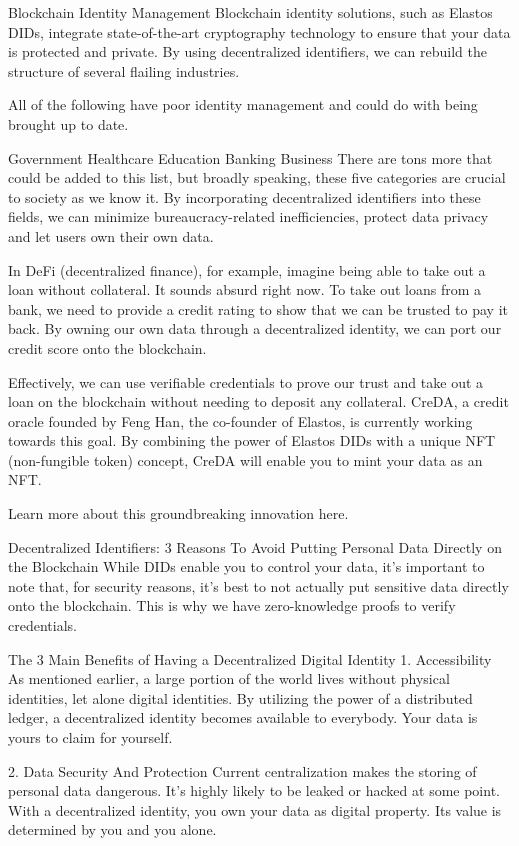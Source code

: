 Blockchain Identity Management
Blockchain identity solutions, such as Elastos DIDs, integrate state-of-the-art cryptography technology to ensure that your data is protected and private. By using decentralized identifiers, we can rebuild the structure of several flailing industries. 

All of the following have poor identity management and could do with being brought up to date.

Government
Healthcare
Education
Banking
Business
There are tons more that could be added to this list, but broadly speaking, these five categories are crucial to society as we know it. By incorporating decentralized identifiers into these fields, we can minimize bureaucracy-related inefficiencies, protect data privacy and let users own their own data.

In DeFi (decentralized finance), for example, imagine being able to take out a loan without collateral. It sounds absurd right now. To take out loans from a bank, we need to provide a credit rating to show that we can be trusted to pay it back. By owning our own data through a decentralized identity, we can port our credit score onto the blockchain.

Effectively, we can use verifiable credentials to prove our trust and take out a loan on the blockchain without needing to deposit any collateral. CreDA, a credit oracle founded by Feng Han, the co-founder of Elastos, is currently working towards this goal. By combining the power of Elastos DIDs with a unique NFT (non-fungible token) concept, CreDA will enable you to mint your data as an NFT. 

Learn more about this groundbreaking innovation here. 

Decentralized Identifiers: 3 Reasons To Avoid Putting Personal Data Directly on the Blockchain
While DIDs enable you to control your data, it’s important to note that, for security reasons, it’s best to not actually put sensitive data directly onto the blockchain. This is why we have zero-knowledge proofs to verify credentials. 

The 3 Main Benefits of Having a Decentralized Digital Identity
1. Accessibility
As mentioned earlier, a large portion of the world lives without physical identities, let alone digital identities. By utilizing the power of a distributed ledger, a decentralized identity becomes available to everybody. Your data is yours to claim for yourself.

2. Data Security And Protection
Current centralization makes the storing of personal data dangerous. It’s highly likely to be leaked or hacked at some point. With a decentralized identity, you own your data as digital property. Its value is determined by you and you alone. 

